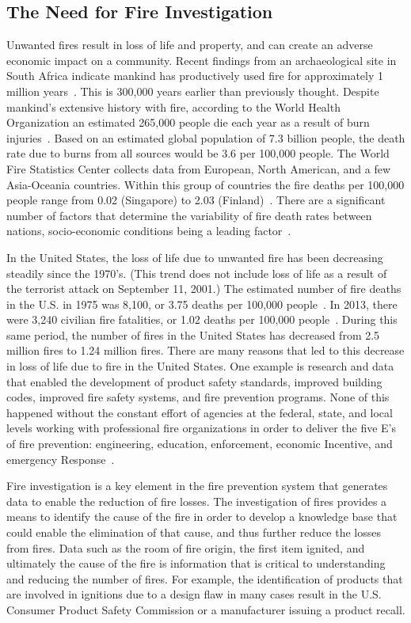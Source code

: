 \documentclass[twoside]{uocthesis}
\begin{document}
\subsection{The Need for Fire Investigation}
Unwanted fires result in loss of life and property, and can create an adverse economic impact on a community.  Recent findings from an archaeological site in South Africa indicate mankind has productively used fire for approximately 1 million years~\cite{Berna:2012}.  This is 300,000 years earlier than previously thought.  Despite mankind's extensive history with fire, according to the World Health Organization an estimated 265,000 people die each year as a result of burn injuries~\cite{WHO:2014}.  Based on an estimated global population of 7.3 billion people, the death rate due to burns from all sources would be 3.6 per 100,000 people.  The World Fire Statistics Center collects data from European, North American, and a few Asia-Oceania countries.  Within this group of countries the fire deaths per 100,000 people range from 0.02 (Singapore) to 2.03 (Finland)~\cite{Climate:2014}. There are a significant number of factors that determine the variability of fire death rates between nations, socio-economic conditions being a leading factor~\cite{WHO:2014}.

In the United States, the loss of life due to unwanted fire has been decreasing steadily since the 1970’s.  (This trend does not include loss of life as a result of the terrorist attack on September 11, 2001.)  The estimated number of fire deaths in the U.S. in 1975 was 8,100, or 3.75 deaths per 100,000 people~\cite{America_Burning_Revisited}.  In 2013, there were 3,240 civilian fire fatalities, or 1.02 deaths per 100,000 people~\cite{Karter:2014}.  During this same period, the number of fires in the United States has decreased from 2.5 million fires to 1.24 million fires.  There are many reasons that led to this decrease in loss of life due to fire in the United States.  One example is research and data that enabled the development of product safety standards, improved building codes, improved fire safety systems, and fire prevention programs.  None of this happened without the constant effort of agencies at the federal, state, and local levels working with professional fire organizations in order to deliver the five E’s of fire prevention: engineering, education, enforcement, economic Incentive, and emergency Response~\cite{FEMA:2013}.

Fire investigation is a key element in the fire prevention system that generates data to enable the reduction of fire losses.  The investigation of fires provides a means to identify the cause of the fire in order to develop a knowledge base that could enable the elimination of that cause, and thus further reduce the losses from fires.  Data such as the room of fire origin, the first item ignited, and ultimately the cause of the fire is information that is critical to understanding and reducing the number of fires.  For example, the identification of products that are involved in ignitions due to a design flaw in many cases result in the U.S. Consumer Product Safety Commission or a manufacturer issuing a product recall.
\end{document}
